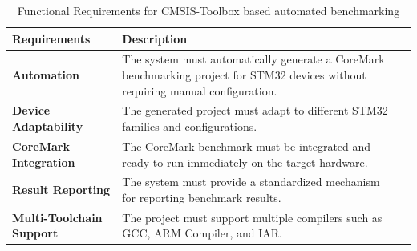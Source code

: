\begin{table}[htbp]
    \centering
    \caption{Functional Requirements for CMSIS-Toolbox based automated benchmarking}
    \label{tab:functional_requirements}
    \begin{tabularx}{\linewidth}{@{}>{\bfseries}l X X@{}}
        \toprule
        Requirements & Description \\
        \midrule
        Automation & The system must automatically generate a CoreMark benchmarking project for STM32 devices without requiring manual configuration. \\ \midrule
        Device Adaptability & The generated project must adapt to different STM32 families and configurations. \\ \midrule
        CoreMark Integration & The CoreMark benchmark must be integrated and ready to run immediately on the target hardware. \\ \midrule
        Result Reporting & The system must provide a standardized mechanism for reporting benchmark results. \\ \midrule
        Multi-Toolchain Support & The project must support multiple compilers such as GCC, ARM Compiler, and IAR. \\ \bottomrule
    \end{tabularx}
\end{table}

